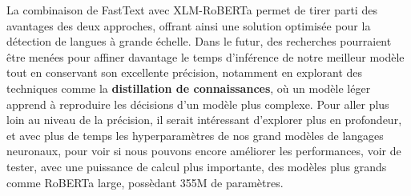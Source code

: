 La combinaison de FastText avec XLM-RoBERTa permet de tirer parti des avantages des deux approches, offrant ainsi une solution optimisée pour la détection de langues à grande échelle. Dans le futur, des recherches pourraient être menées pour affiner davantage le temps d'inférence de notre meilleur modèle tout en conservant son excellente précision, notamment en explorant des techniques comme la \textbf{distillation de connaissances}, où un modèle léger apprend à reproduire les décisions d’un modèle plus complexe. 
Pour aller plus loin au niveau de la précision, il serait intéressant d'explorer plus en profondeur, et avec plus de temps les hyperparamètres de nos grand modèles de langages neuronaux, pour voir si nous pouvons encore améliorer les performances, voir de tester, avec une puissance de calcul plus importante, des modèles plus grands comme RoBERTa large, possèdant 355M de paramètres.

